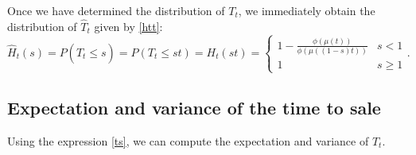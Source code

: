 \documentclass{article}
\numberwithin{equation}{section}
\begin{document}
Once we have determined 
the distribution of $T_t$, we immediately obtain the distribution of
$\hat{T}_t$ given by \eqref{htt}:
\begin{equation}\label{htt1}\hat{H}_t(s)=P(\hat{T}_t\leq s)
=P(T_t\leq st)=H_t(st)
=\begin{cases}
	1-\frac{\phi(\mu(t))}{\phi(\mu((1-s)t))} & s<1\\
	1 & s\geq 1
\end{cases}.
\end{equation}



\subsection{Expectation and variance of the time to sale}

Using the expression \eqref{ts}, we can compute the expectation and variance of $T_t$.
\end{document}
